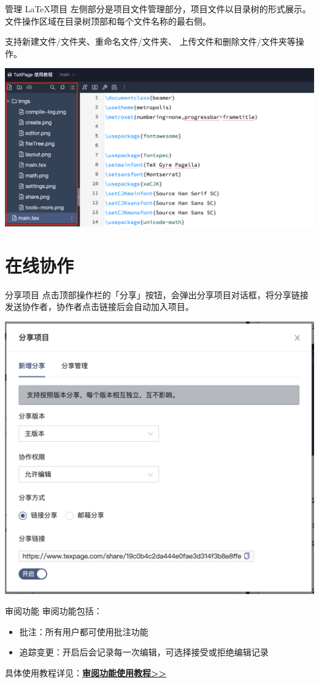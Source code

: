 \documentclass{beamer}
\begin{document}
\begin{frame}{管理 \LaTeX 项目}
左侧部分是项目文件管理部分，项目文件以目录树的形式展示。
文件操作区域在目录树顶部和每个文件名称的最右侧。

支持新建文件/文件夹、重命名文件/文件夹、
上传文件和删除文件/文件夹等操作。

\begin{center}
\includegraphics[width=.75\textwidth]{imgs/fileTree.png}
\end{center}
\end{frame}



\section{在线协作}

\begin{frame}{分享项目}
点击顶部操作栏的「分享」按钮，会弹出分享项目对话框，将分享链接发送协作者，协作者点击链接后会自动加入项目。

\begin{center}
\includegraphics[width=.5\textwidth]{imgs/share.png}
\end{center}

\end{frame}



\begin{frame}{审阅功能}
审阅功能包括：
\begin{itemize}
\item 批注：所有用户都可使用批注功能
\item 追踪变更：开启后会记录每一次编辑，可选择接受或拒绝编辑记录
\end{itemize}
具体使用教程详见：\href{https://www.texpage.com/docs/features/texpage-review/}{\textbf{审阅功能使用教程{}>>}}
\end{frame}
\end{document}
